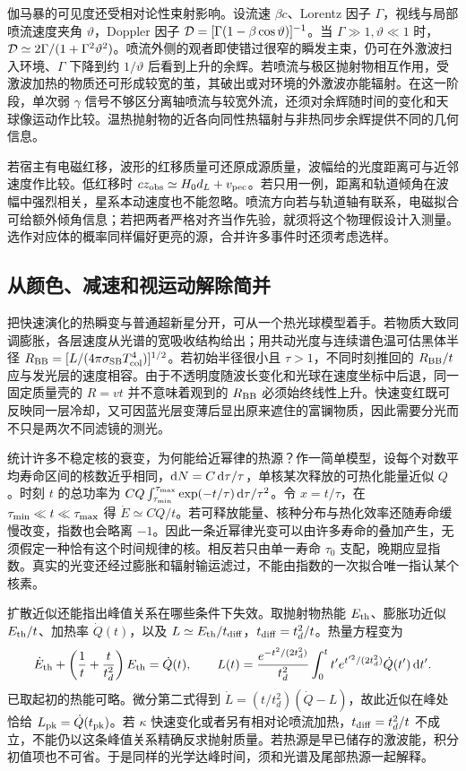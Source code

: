伽马暴的可见度还受相对论性束射影响。设流速 $\beta c$、Lorentz 因子 $\Gamma$，视线与局部喷流速度夹角 $\vartheta$，Doppler 因子 ${\cal D}=[\Gamma(1-\beta\cos\vartheta)]^{-1}$。当 $\Gamma\gg1,\vartheta\ll1$ 时，${\cal D}\simeq2\Gamma/(1+\Gamma^2\vartheta^2)$。喷流外侧的观者即使错过很窄的瞬发主束，仍可在外激波扫入环境、$\Gamma$ 下降到约 $1/\vartheta$ 后看到上升的余辉。若喷流与极区抛射物相互作用，受激波加热的物质还可形成较宽的茧，其破出或对环境的外激波亦能辐射。在这一阶段，单次弱 $\gamma$ 信号不够区分离轴喷流与较宽外流，还须对余辉随时间的变化和天球像运动作比较。温热抛射物的近各向同性热辐射与非热同步余辉提供不同的几何信息。

若宿主有电磁红移，波形的红移质量可还原成源质量，波幅给的光度距离可与近邻速度作比较。低红移时 $cz_{\rm obs}\simeq H_0 d_L+v_{\rm pec}$。若只用一例，距离和轨道倾角在波幅中强烈相关，星系本动速度也不能忽略。喷流方向若与轨道轴有联系，电磁拟合可给额外倾角信息；若把两者严格对齐当作先验，就须将这个物理假设计入测量。选作对应体的概率同样偏好更亮的源，合并许多事件时还须考虑选样。

\subsection{从颜色、减速和视运动解除简并}

把快速演化的热瞬变与普通超新星分开，可从一个热光球模型着手。若物质大致同调膨胀，各层速度从光谱的宽吸收结构给出；用共动光度与连续谱色温可估黑体半径 $R_{\rm BB}=[L/(4\pi\sigma_{\rm SB}T_{\rm col}^4)]^{1/2}$。若初始半径很小且 $\tau>1$，不同时刻推回的 $R_{\rm BB}/t$ 应与发光层的速度相容。由于不透明度随波长变化和光球在速度坐标中后退，同一固定质量壳的 $R=vt$ 并不意味着观到的 $R_{\rm BB}$ 必须始终线性上升。快速变红既可反映同一层冷却，又可因蓝光层变薄后显出原来遮住的富镧物质，因此需要分光而不只是两次不同滤镜的测光。

统计许多不稳定核的衰变，为何能给近幂律的热源？作一简单模型，设每个对数平均寿命区间的核数近乎相同，$\dd N=C\,\dd\tau/\tau$，单核某次释放的可热化能量近似 $Q$。时刻 $t$ 的总功率为 $CQ\int_{\tau_{\rm min}}^{\tau_{\rm max}}\exp(-t/\tau)\,\dd\tau/\tau^2$。令 $x=t/\tau$，在 $\tau_{\rm min}\ll t\ll\tau_{\rm max}$ 得 $\dot E\simeq CQ/t$。若可释放能量、核种分布与热化效率还随寿命缓慢改变，指数也会略离 $-1$。因此一条近幂律光变可以由许多寿命的叠加产生，无须假定一种恰有这个时间规律的核。相反若只由单一寿命 $\tau_0$ 支配，晚期应显指数。真实的光变还经过膨胀和辐射输运滤过，不能由指数的一次拟合唯一指认某个核素。

扩散近似还能指出峰值关系在哪些条件下失效。取抛射物热能 $E_{\rm th}$、膨胀功近似 $E_{\rm th}/t$、加热率 $\dot Q(t)$，以及 $L\simeq E_{\rm th}/t_{\rm diff}$，$t_{\rm diff}=t_d^2/t$。热量方程变为
\[
 \dot E_{\rm th}+\left(\frac1t+\frac{t}{t_d^2}\right)E_{\rm th}
       =\dot Q(t),\qquad
 L(t)=\frac{e^{-t^2/(2t_d^2)}}{t_d^2}
        \int_0^t t' e^{t'^2/(2t_d^2)}\dot Q(t')\,\dd t' .
\]
已取起初的热能可略。微分第二式得到 $\dot L=(t/t_d^2)(\dot Q-L)$，故此近似在峰处恰给 $L_{\rm pk}=\dot Q(t_{\rm pk})$。若 $\kappa$ 快速变化或者另有相对论喷流加热，$t_{\rm diff}=t_d^2/t$ 不成立，不能仍以这条峰值关系精确反求抛射质量。若热源是早已储存的激波能，积分初值项也不可省。于是同样的光学达峰时间，须和光谱及尾部热源一起解释。

